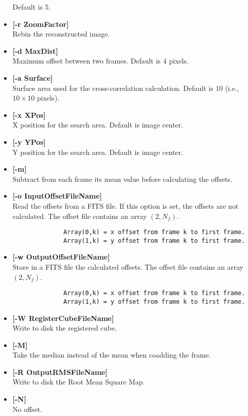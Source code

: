 \begin{itemize}
\begin{enumerate}
\end{enumerate} 
Default is 5.
\item {\bf [-r ZoomFactor]}  \\
Rebin the reconstructed image.
\item {\bf [-d MaxDist]} \\
Maximum offset between two frames. Default is 4 pixels.
\item {\bf [-a Surface]}  \\
Surface area used for the cross-correlation calculation.
Default is 10 (i.e., $10 \times 10$ pixels).
\item {\bf [-x XPos]}  \\
X position for the search area. Default is image center.
\item {\bf [-y YPos]}  \\
Y position for the search area. Default is image center.
\item {\bf [-m]}  \\
Subtract from each frame its mean value before calculating the offsets.
\item {\bf [-o InputOffsetFileName]}  \\
Read the offsets from a FITS file. If this option is set, the offsets are
not calculated.
The offset file contains an array $(2,N_f)$.
\begin{verbatim}
              Array(0,k) = x offset from frame k to first frame.
              Array(1,k) = y offset from frame k to first frame.
\end{verbatim}
\item {\bf [-w OutputOffsetFileName]}  \\
Store in a FITS file the calculated offsets. The 
offset file contains an array $(2,N_f)$.
\begin{verbatim}
              Array(0,k) = x offset from frame k to first frame.
              Array(1,k) = y offset from frame k to first frame.
\end{verbatim}
\item {\bf [-W RegisterCubeFileName]}  \\
Write to disk the registered cube.
\item {\bf [-M]}  \\
Take the median instead of the mean when coadding the frame.
\item {\bf [-R OutputRMSFileName]}  \\
Write to disk the Root Mean Square Map.
\item {\bf [-N]}  \\
No offset.
\end{itemize}
